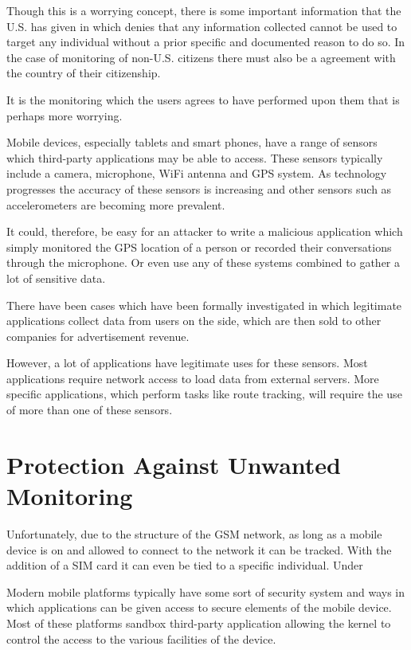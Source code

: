 \documentclass[12pt, a4paper]{article}
\begin{document}
Though this is a worrying concept, there is some important information that the
U.S. has given in \cite{clapper2013facts} which denies that any information
collected cannot be used to target any individual without a prior specific and
documented reason to do so. In the case of monitoring of non-U.S. citizens
there must also be a agreement with the country of their citizenship.

It is the monitoring which the users agrees to have performed upon them that is
perhaps more worrying.

Mobile devices, especially tablets and smart phones, have a range of sensors
which third-party applications may be able to access. These sensors typically
include a camera, microphone, WiFi antenna and GPS system. As technology
progresses the accuracy of these sensors is increasing and other sensors such
as accelerometers are becoming more prevalent.

It could, therefore, be easy for an attacker to write a malicious application
which simply monitored the GPS location of a person or recorded their
conversations through the microphone. Or even use any of these systems combined
to gather a lot of sensitive data.

There have been cases which have been formally
investigated\cite{ftc2013flashlight} in which legitimate applications collect
data from users on the side, which are then sold to other companies for
advertisement revenue.

However, a lot of applications have legitimate uses for these sensors. Most
applications require network access to load data from external servers. More
specific applications, which perform tasks like route tracking, will require
the use of more than one of these sensors.

\newpage
\section{Protection Against Unwanted Monitoring}

Unfortunately, due to the structure of the \gls{GSM} network, as long as a
mobile device is on and allowed to connect to the network it can be tracked.
With the addition of a \gls{SIM} card it can even be tied to a specific
individual. Under \cite{directive2006/24/EC}

Modern mobile platforms typically have some sort of security system and ways in
which applications can be given access to secure elements of the mobile device.
Most of these platforms sandbox third-party application allowing the kernel to
control the access to the various facilities of the device.
\end{document}
